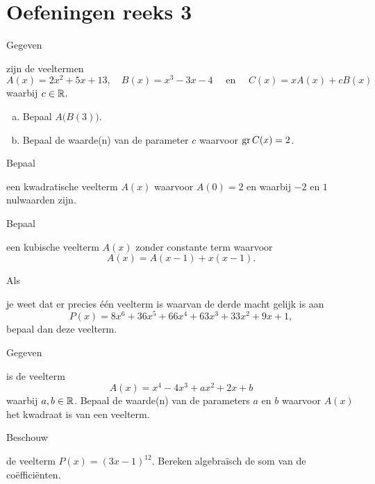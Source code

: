 \documentclass{ximera}
\begin{document}
\clearpage

\section*{Oefeningen reeks 3}

\begin{Oefening}\setcounter{enumi}{12}
\hypertarget{oef1.12}{Gegeven} zijn de veeltermen 
\[
A(x) = 2x^2 + 5x + 13, \quad B(x) =  x^3-3x-4  \quad \text{ en } \quad C(x) = xA(x) + cB(x)
\]
waarbij $c \in \mathbb{R}$.
\begin{enumerate}[(a)]
\item
Bepaal $A\bigl(B(3)\bigr)$.
\item
Bepaal de waarde(n) van de parameter $c$ waarvoor $\operatorname{gr} C(x) = 2$.
\end{enumerate}
\end{Oefening}

\begin{Oefening}\setcounter{enumi}{13} 
\hypertarget{oef1.13}{Bepaal} een kwadratische veelterm $A(x)$ waarvoor $A(0) = 2$ en waarbij $-2$ en $1$ nulwaarden zijn.
\end{Oefening}

\begin{Oefening}\setcounter{enumi}{14} 
\hypertarget{oef1.14}{Bepaal} een kubische veelterm $A(x)$ zonder constante term waarvoor
\[
A(x) = A(x-1) + x(x-1).
\]
\end{Oefening}

\begin{Oefening}\setcounter{enumi}{15} 
\hypertarget{oef1.15}{Als} je weet dat er precies \'e\'en veelterm is waarvan de derde macht gelijk is aan 
\[
P(x) = 8x^6 + 36x^5 + 66x^4 + 63x^3 + 33x^2 + 9x + 1,
\]
bepaal dan deze veelterm.
\end{Oefening}

\begin{Oefening}\setcounter{enumi}{16} 
\hypertarget{oef1.16}{Gegeven} is de veelterm
\[
A(x) = x^4 - 4x^3 + ax^2 + 2x + b
\]
waarbij $a,b \in \mathbb{R}$. Bepaal de waarde(n) van de parameters $a$ en $b$ waarvoor $A(x)$ het kwadraat is van een veelterm. 
\end{Oefening}

\begin{Oefening}\setcounter{enumi}{17} 
\hypertarget{oef1.17}{Beschouw} de veelterm $P(x) = (3x - 1)^{12}$. Bereken algebra\"isch de som van de co\"effici\"enten. 
\end{Oefening}
\end{document}
